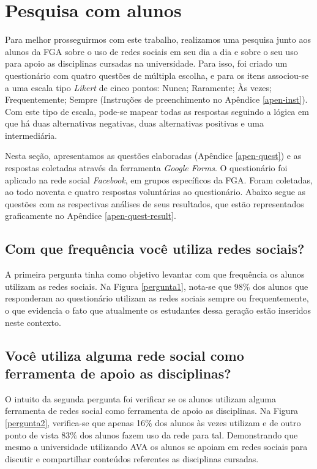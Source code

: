 \section{Pesquisa com alunos}
\label{pesquisa-alunos}

Para melhor prosseguirmos com este trabalho, realizamos uma pesquisa junto aos alunos da FGA sobre o uso de redes sociais em seu dia a dia e sobre o seu uso para apoio as disciplinas cursadas na universidade. Para isso, foi criado um questionário com quatro questões de múltipla escolha, e para os itens associou-se a uma escala tipo \emph{Likert} de cinco pontos: Nunca; Raramente; Às vezes; Frequentemente; Sempre (Instruções de preenchimento no Apêndice \ref{apen-inst}). Com este tipo de escala, pode-se mapear todas as respostas seguindo a lógica em que há duas alternativas negativas, duas alternativas positivas e uma intermediária.

Nesta seção, apresentamos as questões elaboradas (Apêndice \ref{apen-quest}) e as respostas coletadas através da ferramenta \textit{Google Forms}. O questionário foi aplicado na rede social \textit{Facebook}, em grupos específicos da FGA. Foram coletadas, ao todo noventa e quatro respostas voluntárias ao questionário. Abaixo segue as questões com as respectivas análises de seus resultados, que estão representados graficamente no Apêndice \ref{apen-quest-result}.

\subsection*{Com que frequência você utiliza redes sociais?}

A primeira pergunta tinha como objetivo levantar com que frequência os alunos utilizam as redes sociais. Na Figura \ref{pergunta1}, nota-se que 98\% dos alunos que responderam ao questionário utilizam as redes sociais sempre ou frequentemente, o que evidencia o fato que atualmente os estudantes dessa geração estão inseridos neste contexto.

\subsection*{Você utiliza alguma rede social como ferramenta de apoio as disciplinas?}

O intuito da segunda pergunta foi verificar se os alunos utilizam alguma ferramenta de redes social como ferramenta de apoio as disciplinas. Na Figura \ref{pergunta2}, verifica-se que apenas 16\% dos alunos às vezes utilizam e de outro ponto de vista 83\% dos alunos fazem uso da rede para tal. Demonstrando que mesmo a universidade utilizando AVA os alunos se apoiam em redes sociais para discutir e compartilhar conteúdos referentes as disciplinas cursadas.

